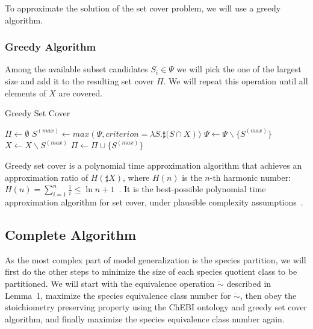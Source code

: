 \documentclass[10pt]{bmc_article}
\newenvironment{bmcformat}{\baselineskip20pt\sloppy\setboolean{publ}{false}}{\baselineskip20pt\sloppy}
\begin{document}
\begin{bmcformat}
To approximate the solution of the set cover problem, we will use a greedy algorithm.

\subsubsection*{Greedy Algorithm}
Among the available subset candidates $S_i \in \Psi$ we will pick the one of the largest size and add it to the resulting set cover $\Pi$. We will repeat this operation until all elements of $X$ are covered. \\

\begin{algorithm}[H]
\SetAlgoVlined
{}
\caption{Greedy Set Cover}
\BlankLine
\BlankLine
$\Pi \leftarrow \emptyset$ 
\BlankLine
\BlankLine
{} {
	$S^{(max)} \leftarrow max(\Psi, criterion=\lambda{S}.\sharp{(S\cap{X}}))$ \;
	\BlankLine
	$\Psi \leftarrow \Psi\backslash\{S^{(max)}\}$ \;
	$X \leftarrow X\backslash{S^{(max)}}$ \;
	$\Pi \leftarrow \Pi\cup\{S^{(max)}\}$ \;
}
\BlankLine
\KwRet{$\Pi$}
\end{algorithm} 

Greedy set cover is a polynomial time approximation algorithm that achieves an approximation ratio of $H(\sharp X)$, where $H(n)$ is the $n$-th harmonic number: $H(n) = \sum^n_{i = 1}\frac{1}{i} \leq \ln{n} + 1$~\cite{Chvatal1979}. It is the best-possible polynomial time approximation algorithm for set cover, under plausible complexity assumptions~\cite{Feige1998}. 

\subsection*{Complete Algorithm}
As the most complex part of model generalization is the species partition, we will first do the other steps to minimize the size of each species quotient class to be partitioned. We will start with the equivalence operation $\mathring{\sim}$ described in Lemma~1, maximize the species equivalence class number for $\mathring{\sim}$, then obey the stoichiometry preserving property using the ChEBI ontology and greedy set cover algorithm, and finally maximize the species equivalence class number again.\\


\end{bmcformat}
\end{document}
